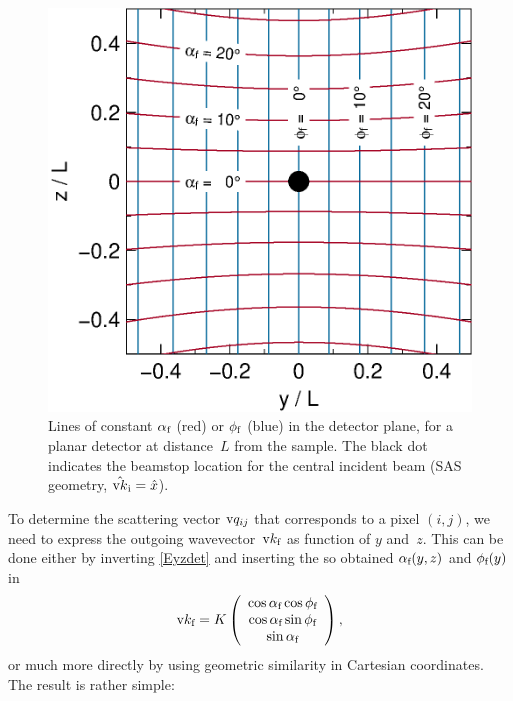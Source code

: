 \begin{figure}[t]
\begin{center}
\includegraphics[width=.47\textwidth]{fig/drawing/SAS_const_alphi.ps}
\end{center}
\caption{Lines of constant $\alpha_\sf$ (red) or $\phi_\sf$ (blue)
in the detector plane,
for a planar detector at distance~$L$ from the sample.
The black dot indicates the beamstop location for
the central incident beam (SAS geometry, $\hat\k_\si = \hat x$).}
\label{Fconstalphi}
\end{figure}

To determine the scattering vector $\q_{ij}$
that corresponds to a pixel $(i,j)$,
we need to express the outgoing wavevector~$\k_\sf$ as function of $y$ and~$z$.
This can be done either by inverting \cref{Eyzdet}
and inserting the so obtained $\alpha_\sf(y,z)$ and $\phi_\sf(y)$ in
\begin{equation}\label{Ekf_by_angle}
  \k_\sf=K\left(\begin{array}{c}
   \cos\alpha_\sf\cos\phi_\sf\\
   \cos\alpha_\sf\sin\phi_\sf\\
   \sin\alpha_\sf\end{array}\right),
\end{equation}
or much more directly by using geometric similarity in Cartesian coordinates.
The result is rather simple:


